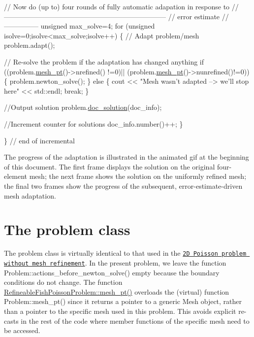  
\begin{DoxyCodeInclude}
 \textcolor{comment}{// Now do (up to) four rounds of fully automatic adapation in response to }
 \textcolor{comment}{//-----------------------------------------------------------------------}
 \textcolor{comment}{// error estimate}
 \textcolor{comment}{//---------------}
 \textcolor{keywordtype}{unsigned} max\_solve=4;
 \textcolor{keywordflow}{for} (\textcolor{keywordtype}{unsigned} isolve=0;isolve<max\_solve;isolve++)
  \{
   \textcolor{comment}{// Adapt problem/mesh}
   problem.adapt(); 
         
   \textcolor{comment}{// Re-solve the problem if the adaptation has changed anything}
   \textcolor{keywordflow}{if} ((problem.\hyperlink{classRefineableFishPoissonProblem_a803c9050b07b35aba22f08a5a9e59f2c}{mesh\_pt}()->nrefined()  !=0)||
       (problem.\hyperlink{classRefineableFishPoissonProblem_a803c9050b07b35aba22f08a5a9e59f2c}{mesh\_pt}()->nunrefined()!=0))
    \{
     problem.newton\_solve();
    \}
   \textcolor{keywordflow}{else}
    \{
     cout << \textcolor{stringliteral}{"Mesh wasn't adapted --> we'll stop here"} << std::endl;
     \textcolor{keywordflow}{break};
    \}
   
   \textcolor{comment}{//Output solution}
   problem.\hyperlink{classRefineableFishPoissonProblem_aeee1bf23216971b50b8822c45e62c48b}{doc\_solution}(doc\_info);
   
   \textcolor{comment}{//Increment counter for solutions }
   doc\_info.number()++;
  \}
 
 
\} \textcolor{comment}{// end of incremental}

\end{DoxyCodeInclude}


The progress of the adaptation is illustrated in the animated gif at the beginning of this document. The first frame displays the solution on the original four-\/element mesh; the next frame shows the solution on the uniformly refined mesh; the final two frames show the progress of the subsequent, error-\/estimate-\/driven mesh adaptation.



 

\hypertarget{index_problem}{}\section{The problem class}\label{index_problem}
The problem class is virtually identical to that used in the \href{../../../poisson/two_d_poisson/html/index.html}{\tt 2D Poisson problem without mesh refinement}. In the present problem, we leave the function {\ttfamily Problem\+::actions\+\_\+before\+\_\+newton\+\_\+solve()} empty because the boundary conditions do not change. The function {\ttfamily \hyperlink{classRefineableFishPoissonProblem_a803c9050b07b35aba22f08a5a9e59f2c}{Refineable\+Fish\+Poisson\+Problem\+::mesh\+\_\+pt()}} overloads the (virtual) function {\ttfamily Problem\+::mesh\+\_\+pt()} since it returns a pointer to a generic {\ttfamily Mesh} object, rather than a pointer to the specific mesh used in this problem. This avoids explicit re-\/casts in the rest of the code where member functions of the specific mesh need to be accessed.

